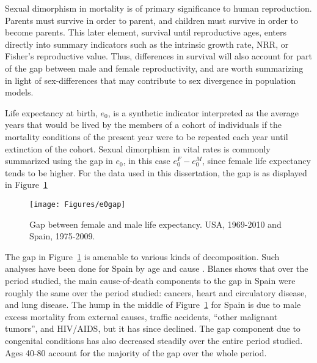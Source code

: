  \FloatBarrier
Sexual dimorphism in mortality is of primary significance to human reproduction.
Parents must survive in order to parent, and children must survive in order to
become parents. This later element, survival until reproductive ages, enters
directly into summary indicators such as the intrinsic growth rate, NRR, or
Fisher's reproductive value. Thus, differences in survival will also account for
part of the gap between male and female reproductivity, and are worth summarizing 
in light of sex-differences
that may contribute to sex divergence in population models.

Life expectancy at birth, $e_0$, is a synthetic indicator interpreted as the
average years that would be lived by the members of a cohort of individuals if
the mortality conditions of the present year were to be repeated each year until extinction of
the cohort. Sexual dimorphism in vital rates is commonly summarized using the
gap in $e_0$, in this case $e_0^F - e_0^M$, since female life expectancy tends
to be higher. For the data used in this dissertation, the gap is as displayed in
Figure~\ref{fig:e0gap}

\begin{figure}[!ht]
  \centering
    \caption{Gap between female and male life expectancy. USA,
    1969-2010 and Spain, 1975-2009.}
     \texttt{[image: Figures/e0gap]}
     \label{fig:e0gap}
\end{figure}

The gap in Figure~\ref{fig:e0gap} is amenable to various kinds of decomposition.
Such analyses have been done for Spain by age and cause \citep[pp 217-218 and
447]{amand2007thesis}. Blanes shows that over the period studied, the main cause-of-death components to the
gap in Spain were roughly the same over the period studied: cancers, heart
and circulatory disease, and lung disease. The hump in the middle of
Figure~\ref{fig:e0gap} for Spain is due to male excess mortality from external
causes, traffic accidents, ``other malignant tumors'', and HIV/AIDS, but it has
since declined. The gap component due to congenital conditions has also
decreased steadily over the entire period studied. Ages 40-80 account for the
majority of the gap over the whole period.

